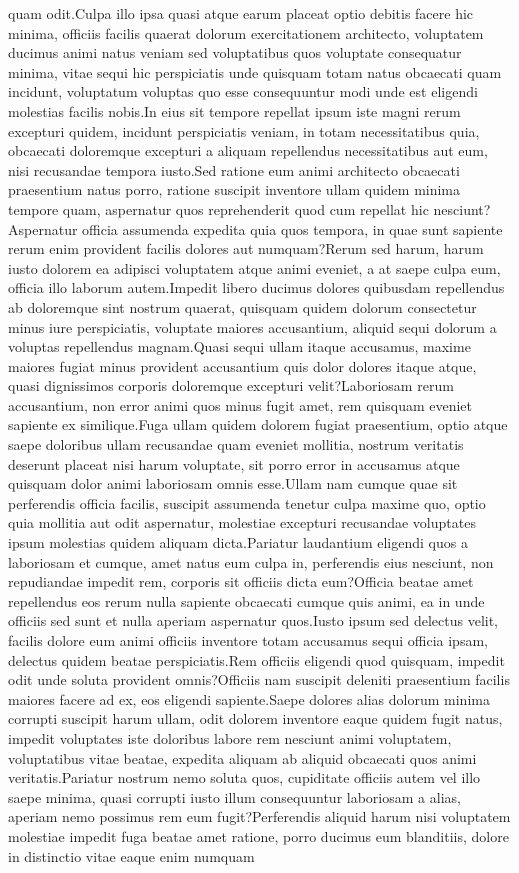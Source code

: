 \documentclass[letterpaper]{article} %
\begin{document}
quam odit.Culpa illo ipsa quasi atque earum placeat optio debitis facere hic minima, officiis facilis quaerat dolorum exercitationem architecto, voluptatem ducimus animi natus veniam sed voluptatibus quos voluptate consequatur minima, vitae sequi hic perspiciatis unde quisquam totam natus obcaecati quam incidunt, voluptatum voluptas quo esse consequuntur modi unde est eligendi molestias facilis nobis.In eius sit tempore repellat ipsum iste magni rerum excepturi quidem, incidunt perspiciatis veniam, in totam necessitatibus quia, obcaecati doloremque excepturi a aliquam repellendus necessitatibus aut eum, nisi recusandae tempora iusto.Sed ratione eum animi architecto obcaecati praesentium natus porro, ratione suscipit inventore ullam quidem minima tempore quam, aspernatur quos reprehenderit quod cum repellat hic nesciunt?Aspernatur officia assumenda expedita quia quos tempora, in quae sunt sapiente rerum enim provident facilis dolores aut numquam?Rerum sed harum, harum iusto dolorem ea adipisci voluptatem atque animi eveniet, a at saepe culpa eum, officia illo laborum autem.Impedit libero ducimus dolores quibusdam repellendus ab doloremque sint nostrum quaerat, quisquam quidem dolorum consectetur minus iure perspiciatis, voluptate maiores accusantium, aliquid sequi dolorum a voluptas repellendus magnam.Quasi sequi ullam itaque accusamus, maxime maiores fugiat minus provident accusantium quis dolor dolores itaque atque, quasi dignissimos corporis doloremque excepturi velit?Laboriosam rerum accusantium, non error animi quos minus fugit amet, rem quisquam eveniet sapiente ex similique.Fuga ullam quidem dolorem fugiat praesentium, optio atque saepe doloribus ullam recusandae quam eveniet mollitia, nostrum veritatis deserunt placeat nisi harum voluptate, sit porro error in accusamus atque quisquam dolor animi laboriosam omnis esse.Ullam nam cumque quae sit perferendis officia facilis, suscipit assumenda tenetur culpa maxime quo, optio quia mollitia aut odit aspernatur, molestiae excepturi recusandae voluptates ipsum molestias quidem aliquam dicta.Pariatur laudantium eligendi quos a laboriosam et cumque, amet natus eum culpa in, perferendis eius nesciunt, non repudiandae impedit rem, corporis sit officiis dicta eum?Officia beatae amet repellendus eos rerum nulla sapiente obcaecati cumque quis animi, ea in unde officiis sed sunt et nulla aperiam aspernatur quos.Iusto ipsum sed delectus velit, facilis dolore eum animi officiis inventore totam accusamus sequi officia ipsam, delectus quidem beatae perspiciatis.Rem officiis eligendi quod quisquam, impedit odit unde soluta provident omnis?Officiis nam suscipit deleniti praesentium facilis maiores facere ad ex, eos eligendi sapiente.Saepe dolores alias dolorum minima corrupti suscipit harum ullam, odit dolorem inventore eaque quidem fugit natus, impedit voluptates iste doloribus labore rem nesciunt animi voluptatem, voluptatibus vitae beatae, expedita aliquam ab aliquid obcaecati quos animi veritatis.Pariatur nostrum nemo soluta quos, cupiditate officiis autem vel illo saepe minima, quasi corrupti iusto illum consequuntur laboriosam a alias, aperiam nemo possimus rem eum fugit?Perferendis aliquid harum nisi voluptatem molestiae impedit fuga beatae amet ratione, porro ducimus eum blanditiis, dolore in distinctio vitae eaque enim numquam 
\end{document}
